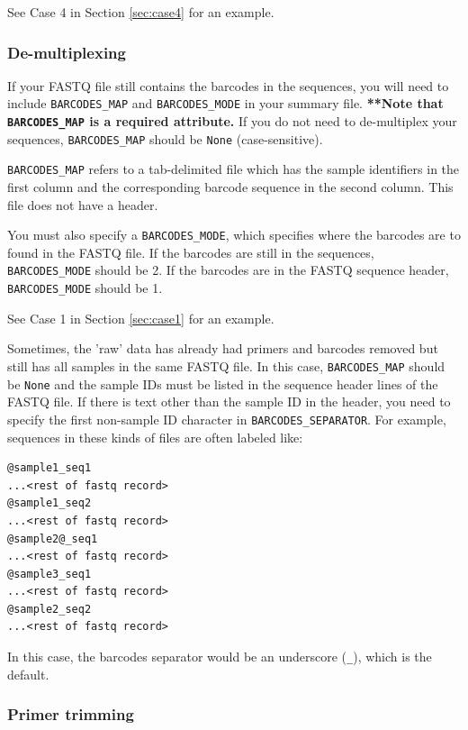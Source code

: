 \documentclass[11pt, oneside]{article}   	%
\begin{document}
See Case 4 in Section \ref{sec:case4} for an example.

\subsubsection{De-multiplexing}

If your FASTQ file still contains the barcodes in the sequences, you
will need to include \texttt{BARCODES\_MAP} and \texttt{BARCODES\_MODE}
in your summary file. \textbf{**Note that \texttt{BARCODES\_MAP} is a 
required attribute.} If you do not need to de-multiplex your sequences,
\texttt{BARCODES\_MAP} should be \texttt{None} (case-sensitive).

\texttt{BARCODES\_MAP} refers to a tab-delimited file which has the
sample identifiers in the first column and the corresponding barcode sequence
in the second column. This file does not have a header. 

You must also specify a \texttt{BARCODES\_MODE}, which specifies where the
barcodes are to found in the FASTQ file. If the barcodes are still in the
sequences, \texttt{BARCODES\_MODE} should be 2. If the barcodes are in
the FASTQ sequence header, \texttt{BARCODES\_MODE} should be 1.

See Case 1 in Section \ref{sec:case1} for an example.

Sometimes, the 'raw' data has already had primers and barcodes removed 
but still has all samples in the same FASTQ file. In this case, \texttt{BARCODES\_MAP} 
should be \texttt{None} and the sample IDs must be listed in the sequence header 
lines of the FASTQ file. If there is text other than the sample ID
in the header, you need to specify the first non-sample ID character
in \texttt{BARCODES\_SEPARATOR}. For example, sequences in these kinds of
files are often labeled like:

\begin{verbatim}
@sample1_seq1
...<rest of fastq record>
@sample1_seq2
...<rest of fastq record>
@sample2@_seq1
...<rest of fastq record>
@sample3_seq1
...<rest of fastq record>
@sample2_seq2
...<rest of fastq record>
\end{verbatim}

In this case, the barcodes separator would be an underscore (\texttt{\_}), which is the default.

\subsubsection{Primer trimming}
\end{document}
